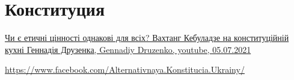  
 
 
 
 
\chapter{Конституция}
\label{sec:topics.konstitucia}

\href{https://www.youtube.com/watch?v=3--6UQ-LR8E}{%
Чи є етичні цінності однакові для всіх? Вахтанг Кебуладзе на конституційній кухні Геннадія Друзенка, %
Gennadiy Druzenko, youtube, 05.07.2021%
}

\url{https://www.facebook.com/Alternativnaya.Konstitucia.Ukrainy/}
